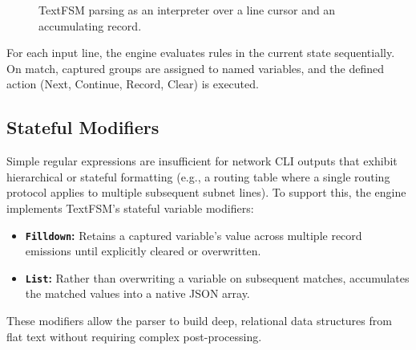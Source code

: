 \documentclass[a4paper,10pt]{article}
\begin{document}
\begin{figure}[H]
\centering
{}
\caption{TextFSM parsing as an interpreter over a line cursor and an accumulating record.}
\label{fig:cs-semantics}
\end{figure}

For each input line, the engine evaluates rules in the current state
sequentially. On match, captured groups are assigned to named
variables, and the defined action (Next, Continue, Record, Clear) is executed.

\subsection{Stateful Modifiers}

Simple regular expressions are insufficient for network CLI outputs that exhibit hierarchical or stateful formatting (e.g., a routing table where a single routing protocol applies to multiple subsequent subnet lines). To support this, the engine implements TextFSM's stateful variable modifiers:
\begin{itemize}
    \item \textbf{\texttt{Filldown}:} Retains a captured variable's value across multiple record emissions until explicitly cleared or overwritten.
    \item \textbf{\texttt{List}:} Rather than overwriting a variable on subsequent matches, accumulates the matched values into a native \ac{JSON} array.
\end{itemize}
These modifiers allow the parser to build deep, relational data structures from flat text without requiring complex post-processing.
\end{document}
